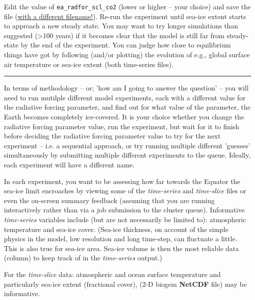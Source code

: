 Edit the value of \texttt{ea\_radfor\_scl\_co2} (lower or higher -- your choice) and save the file (\uline{with a different filename!}). Re-run the experiment until sea-ice extent starts to approach a new steady state. You may want to try  longer simulations than suggested (\textgreater 100 years) if it becomes clear that the model is still far from steady-state by the end of the experiment. You can judge how close to equilibrium things have got by following (and/or plotting) the evolution of e.g., global surface air temperature or sea-ice extent (both time-series files).

\vspace{1mm}
\noindent\rule{4cm}{0.5pt}
\vspace{2mm}

\noindent 
In terms of methodology -- or; 'how am I going to answer the question' -- you will need to run mutilple different model experiments, each with a different value for the radiative forcing parameter, and find out for what value of the parameter, the Earth becomes completely ice-covered. It is your choice whether you change the radiative forcing parameter value, run the experiment, but wait for it to finish before deciding the radiative forcing parameter value to try for the next experiment -- i.e. a sequential approach, or try running multiple different 'guesses' simultaneously by submitting multiple different experiments to the queue. Ideally, each experiment will have a different name.

In each experiment, you want to be assessing how far towards the Equator the sea-ice limit encroaches by viewing some of the \textit{time-series} and \textit{time-slice} files or even the on-screen summary feedback (assuming that you are running interactively rather than via a job submission to the cluster queue). Informative \textit{time-series} variables include (but are not necessarily be limited to): atmospheric temperature and sea-ice cover. (Sea-ice thickness, on account of the simple physics in the model, low resolution and long time-step, can fluctuate a little. This is also true for sea-ice area. Sea-ice volume is then the most reliable data (column) to keep track of in the \textit{time-series} output.)

For the \textit{time-slice} data: atmospheric and ocean surface temperature and particularly sea-ice extent (fractional cover), (2-D biogem \textbf{NetCDF} file) may be informative.

